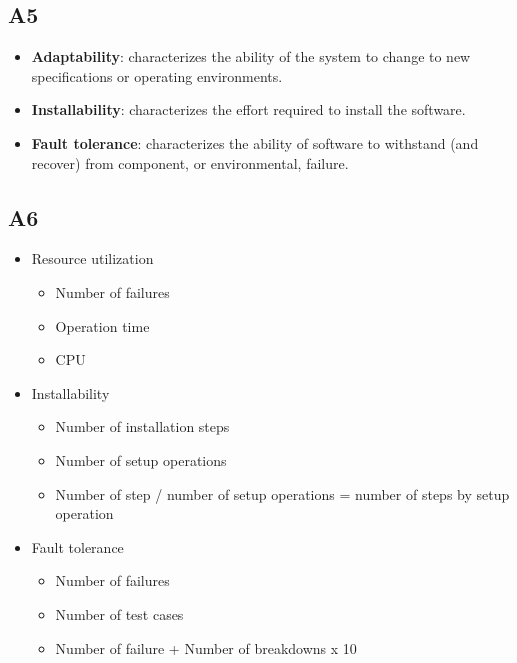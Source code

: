 \subsection{A5}
    \begin{itemize}
        \item \textbf{Adaptability}: characterizes the ability of the system to change to new specifications or operating environments.
        \item \textbf{Installability}: characterizes the effort required to install the software.
        \item \textbf{Fault tolerance}: characterizes the ability of software to withstand (and recover) from component, or environmental, failure.
    \end{itemize}

\subsection{A6}
    \begin{itemize}
        \item Resource utilization
            \begin{itemize}
                \item Number of failures
                \item Operation time
                \item CPU
            \end{itemize}
        \item Installability
            \begin{itemize}
                \item Number of installation steps
                \item Number of setup operations
                \item Number of step / number of setup operations = number of steps by setup operation
            \end{itemize}
        \item Fault tolerance
            \begin{itemize}
                \item Number of failures
                \item Number of test cases
                \item Number of failure + Number of breakdowns x 10
            \end{itemize}
    \end{itemize}

